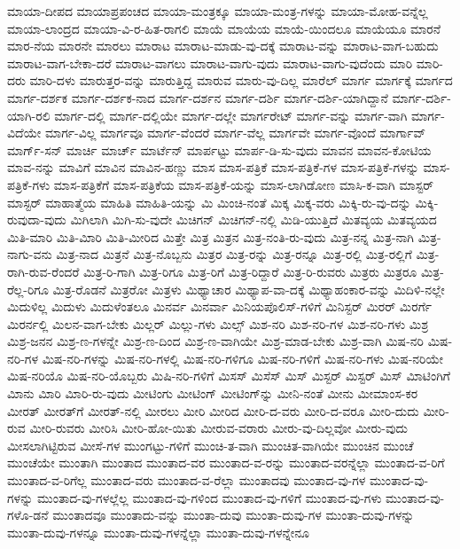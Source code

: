 {ಮಾಯಾ-ದೀಪದ
ಮಾಯಾಪ್ರಪಂಚದ
ಮಾಯಾ-ಮಂತ್ರಕ್ಕೂ
ಮಾಯಾ-ಮಂತ್ರ-ಗಳನ್ನು
ಮಾಯಾ-ಮೋಹ-ವನ್ನೆಲ್ಲ
ಮಾಯಾ-ಲಾಂದ್ರದ
ಮಾಯಾ-ವಿ-ರ-ಹಿತ-ರಾಗಲಿ
ಮಾಯೆ
ಮಾಯೆಯ
ಮಾಯೆ-ಯಿಂದಲೂ
ಮಾಯೆಯೂ
ಮಾರನೆ
ಮಾರ-ನೆಯ
ಮಾರನೇ
ಮಾರಲು
ಮಾರಾಟ
ಮಾರಾಟ-ಮಾಡು-ವು-ದಕ್ಕೆ
ಮಾರಾಟ-ವನ್ನು
ಮಾರಾಟ-ವಾಗ-ಬಹುದು
ಮಾರಾಟ-ವಾಗ-ಬೇಕಾ-ದರೆ
ಮಾರಾಟ-ವಾಗಲು
ಮಾರಾಟ-ವಾಗು-ವುದು
ಮಾರಾಟ-ವಾಗು-ವುದೆಂದು
ಮಾರಿ
ಮಾರಿ-ದರು
ಮಾರಿ-ದಳು
ಮಾರುತ್ತರ-ವನ್ನು
ಮಾರುತ್ತಿದ್ದ
ಮಾರುವ
ಮಾರು-ವು-ದಿಲ್ಲ
ಮಾರೆಲ್
ಮಾರ್ಗ
ಮಾರ್ಗಕ್ಕೆ
ಮಾರ್ಗದ
ಮಾರ್ಗ-ದರ್ಶಕ
ಮಾರ್ಗ-ದರ್ಶಕ-ನಾದ
ಮಾರ್ಗ-ದರ್ಶನ
ಮಾರ್ಗ-ದರ್ಶಿ
ಮಾರ್ಗ-ದರ್ಶಿ-ಯಾಗಿದ್ದಾನೆ
ಮಾರ್ಗ-ದರ್ಶಿ-ಯಾಗಿ-ರಲಿ
ಮಾರ್ಗ-ದಲ್ಲಿ
ಮಾರ್ಗ-ದಲ್ಲಿಯೇ
ಮಾರ್ಗ-ದಲ್ಲೇ
ಮಾರ್ಗರೇಟ್
ಮಾರ್ಗ-ವನ್ನು
ಮಾರ್ಗ-ವಾಗಿ
ಮಾರ್ಗ-ವಿದೆಯೇ
ಮಾರ್ಗ-ವಿಲ್ಲ
ಮಾರ್ಗವೂ
ಮಾರ್ಗ-ವೆಂದರೆ
ಮಾರ್ಗ-ವೆಲ್ಲ
ಮಾರ್ಗವೇ
ಮಾರ್ಗ-ವೊಂದೆ
ಮಾರ್ಗಾವ್
ಮಾರ್ಗ್‌-ಸನ್
ಮಾರ್ಚಿ
ಮಾರ್ಚ್
ಮಾರ್ಟೆನ್
ಮಾರ್ಪಟ್ಟು
ಮಾರ್ಪ-ಡಿ-ಸು-ವುದು
ಮಾವನ
ಮಾವನ-ಕೋಟಿಯ
ಮಾವ-ನನ್ನು
ಮಾವಿಗೆ
ಮಾವಿನ
ಮಾವಿನ-ಹಣ್ಣು
ಮಾಸ
ಮಾಸ-ಪತ್ರಿಕೆ
ಮಾಸ-ಪತ್ರಿಕೆ-ಗಳ
ಮಾಸ-ಪತ್ರಿಕೆ-ಗಳನ್ನು
ಮಾಸ-ಪತ್ರಿಕೆ-ಗಳು
ಮಾಸ-ಪತ್ರಿಕೆಗೆ
ಮಾಸ-ಪತ್ರಿಕೆಯ
ಮಾಸ-ಪತ್ರಿಕೆ-ಯನ್ನು
ಮಾಸ-ಲಾಗಿಡೋಣ
ಮಾಸಿ-ಕ-ವಾಗಿ
ಮಾಸ್ಟರ್
ಮಾಸ್ಟರ್‌
ಮಾಹಾತ್ಮೆಯ
ಮಾಹಿತಿ
ಮಾಹಿತಿ-ಯನ್ನು
ಮಿ
ಮಿಂಚಿ-ನಂತೆ
ಮಿಕ್ಕ
ಮಿಕ್ಕ-ವರು
ಮಿಕ್ಕಿ-ರು-ವು-ದನ್ನು
ಮಿಕ್ಕಿ-ರುವುದಾ-ವುದು
ಮಿಗಿಲಾಗಿ
ಮಿಗಿ-ಸು-ವುದೇ
ಮಿಚಿಗನ್
ಮಿಚಿಗನ್‌-ನಲ್ಲಿ
ಮಿಡಿ-ಯುತ್ತಿದೆ
ಮಿತವ್ಯಯ
ಮಿತವ್ಯಯದ
ಮಿತಿ-ಮಾರಿ
ಮಿತಿ-ಮಿಾರಿ
ಮಿತಿ-ಮೀರಿದ
ಮಿತ್ತೇ
ಮಿತ್ರ
ಮಿತ್ರನ
ಮಿತ್ರ-ನಂತಿ-ರು-ವುದು
ಮಿತ್ರ-ನನ್ನ
ಮಿತ್ರ-ನಾಗಿ
ಮಿತ್ರ-ನಾಗು-ವನು
ಮಿತ್ರ-ನಾದ
ಮಿತ್ರನೆ
ಮಿತ್ರ-ನೊಬ್ಬನು
ಮಿತ್ರರ
ಮಿತ್ರ-ರನ್ನು
ಮಿತ್ರ-ರನ್ನೂ
ಮಿತ್ರ-ರಲ್ಲಿ
ಮಿತ್ರ-ರಲ್ಲಿಗೆ
ಮಿತ್ರ-ರಾಗಿ-ರುವ-ರೆಂದರೆ
ಮಿತ್ರ-ರಿ-ಗಾಗಿ
ಮಿತ್ರ-ರಿಗೂ
ಮಿತ್ರ-ರಿಗೆ
ಮಿತ್ರ-ರಿದ್ದಾರೆ
ಮಿತ್ರ-ರಿ-ರುವರು
ಮಿತ್ರರು
ಮಿತ್ರರೂ
ಮಿತ್ರ-ರೆಲ್ಲ-ರಿಗೂ
ಮಿತ್ರ-ರೊಡನೆ
ಮಿತ್ರರೋ
ಮಿತ್ರಳು
ಮಿಥ್ಯಾಚಾರ
ಮಿಥ್ಯಾಪ-ವಾ-ದಕ್ಕೆ
ಮಿಥ್ಯಾಹಂಕಾರ-ವನ್ನು
ಮಿದಿಳಿ-ನಲ್ಲೇ
ಮಿದುಳಿಲ್ಲ
ಮಿದುಳು
ಮಿದುಳೆಂತಲೂ
ಮಿನರ್ವ
ಮಿನರ್ವಾ
ಮಿನಿಯಪೊಲಿಸ್‌-ಗಳಿಗೆ
ಮಿನಿಸ್ಟರ್
ಮಿರರ್
ಮಿರರ್ಗೆ
ಮಿರರ್ನಲ್ಲಿ
ಮಿಲನ-ವಾಗ-ಬೇಕು
ಮಿಲ್ಲರ್‌
ಮಿಲ್ಲು-ಗಳು
ಮಿಲ್ಸ್
ಮಿಶ-ನರಿ
ಮಿಶ-ನರಿ-ಗಳ
ಮಿಶ-ನರಿ-ಗಳು
ಮಿಶ್ರ
ಮಿಶ್ರ-ಜನನ
ಮಿಶ್ರ-ಣ-ಗಳನ್ನೇ
ಮಿಶ್ರ-ಣ-ದಿಂದ
ಮಿಶ್ರ-ಣ-ವಾಗಿಯೇ
ಮಿಶ್ರ-ಮಾಡ-ಬೇಕು
ಮಿಶ್ರ-ವಾಗಿ
ಮಿಷ-ನರಿ
ಮಿಷ-ನರಿ-ಗಳ
ಮಿಷ-ನರಿ-ಗಳನ್ನು
ಮಿಷ-ನರಿ-ಗಳಲ್ಲಿ
ಮಿಷ-ನರಿ-ಗಳಿಗೂ
ಮಿಷ-ನರಿ-ಗಳಿಗೆ
ಮಿಷ-ನರಿ-ಗಳು
ಮಿಷ-ನರಿಯೇ
ಮಿಷ-ನರಿಯೊ
ಮಿಷ-ನರಿ-ಯೊಬ್ಬರು
ಮಿಷಿ-ನರಿ-ಗಳಿಗೆ
ಮಿಸಸ್
ಮಿಸೆಸ್
ಮಿಸ್
ಮಿಸ್ಟರ್
ಮಿಸ್ಟರ್‌
ಮಿಸ್‌
ಮಿಾಟಿಂಗಿಗೆ
ಮಿಾನು
ಮಿಾರಿ
ಮಿಾರಿ-ರು-ವುದು
ಮೀಟಿಂಗು
ಮೀಟಿಂಗ್
ಮೀಟಿಂಗ್‌ನ್ನು
ಮೀನಿ-ನಂತೆ
ಮೀನು
ಮೀಮಾಂಸ-ಕರ
ಮೀರತ್
ಮೀರತ್‌ಗೆ
ಮೀರತ್‌-ನಲ್ಲಿ
ಮೀರಲು
ಮೀರಿ
ಮೀರಿದ
ಮೀರಿ-ದ-ವರು
ಮೀರಿ-ದ-ವರೂ
ಮೀರಿ-ದುದು
ಮೀರಿ-ರುವ
ಮೀರಿ-ರುವರು
ಮೀರಿಸಿ
ಮೀರಿ-ಹೋ-ಯಿತು
ಮೀರುವ-ವರಾರು
ಮೀರು-ವು-ದಿಲ್ಲವೋ
ಮೀರು-ವುದು
ಮೀಸಲಾಗಿಟ್ಟಿರುವ
ಮೀಸೆ-ಗಳ
ಮುಂಗಟ್ಟು-ಗಳಿಗೆ
ಮುಂಚಿ-ತ-ವಾಗಿ
ಮುಂಚಿತ-ವಾಗಿಯೇ
ಮುಂಚಿನ
ಮುಂಚೆ
ಮುಂಚೆಯೇ
ಮುಂತಾಗಿ
ಮುಂತಾದ
ಮುಂತಾದ-ವರ
ಮುಂತಾದ-ವ-ರನ್ನು
ಮುಂತಾದ-ವರನ್ನೆಲ್ಲಾ
ಮುಂತಾದ-ವ-ರಿಗೆ
ಮುಂತಾದ-ವ-ರಿಗೆಲ್ಲ
ಮುಂತಾದ-ವರು
ಮುಂತಾದ-ವ-ರೆಲ್ಲಾ
ಮುಂತಾದವು
ಮುಂತಾದ-ವು-ಗಳ
ಮುಂತಾದ-ವು-ಗಳನ್ನು
ಮುಂತಾದ-ವು-ಗಳಲ್ಲೆಲ್ಲ
ಮುಂತಾದ-ವು-ಗಳಿಂದ
ಮುಂತಾದ-ವು-ಗಳಿಗೆ
ಮುಂತಾದ-ವು-ಗಳು
ಮುಂತಾದ-ವು-ಗಳೊ-ಡನೆ
ಮುಂತಾದವೂ
ಮುಂತಾದು-ವನ್ನು
ಮುಂತಾ-ದುವು
ಮುಂತಾ-ದುವು-ಗಳ
ಮುಂತಾ-ದುವು-ಗಳನ್ನು
ಮುಂತಾ-ದುವು-ಗಳನ್ನೂ
ಮುಂತಾ-ದುವು-ಗಳನ್ನೆಲ್ಲಾ
ಮುಂತಾ-ದುವು-ಗಳನ್ನೇನೂ
}
